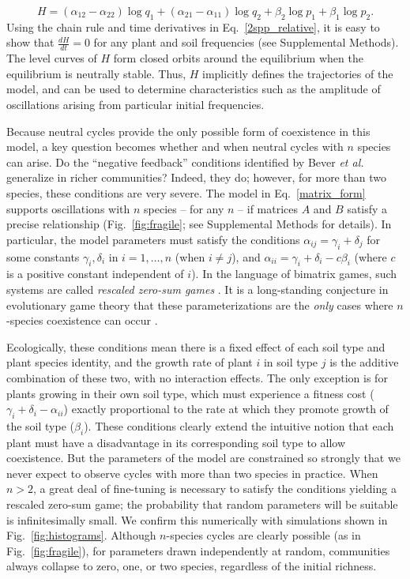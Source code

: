 \documentclass[11pt]{article}
\begin{document}
\begin{equation}
	H = (\alpha_{12} - \alpha_{22}) \log q_1 + (\alpha_{21} - \alpha_{11}) \log q_2 + \beta_2 \log p_1 + \beta_1 \log p_2 .
\end{equation} 
Using the chain rule and time derivatives in Eq.~\ref{2spp_relative}, it is easy to show that $\frac{dH}{dt} = 0$ for any plant and soil frequencies (see Supplemental Methods). The level curves of $H$ form closed orbits around the equilibrium when the equilibrium is neutrally stable. Thus, $H$ implicitly defines the trajectories of the model, and can be used to determine characteristics such as the amplitude of oscillations arising from particular initial frequencies.

Because neutral cycles provide the only possible form of coexistence in this model, a key question becomes whether and when neutral cycles with $n$ species can arise. Do the ``negative feedback'' conditions identified by Bever \textit{et al.} generalize in richer communities? Indeed, they do; however, for more than two species, these conditions are very severe. The model in Eq.~\ref{matrix_form} supports oscillations with $n$ species -- for any $n$ -- if matrices $A$ and $B$ satisfy a precise relationship (Fig.~\ref{fig:fragile}; see Supplemental Methods for details). In particular, the model parameters must satisfy the conditions $\alpha_{ij} = \gamma_i + \delta_j$ for some constants $\gamma_i, \delta_i$ in $i = 1, \dots, n$ (when $i \neq j$), and $\alpha_{ii} = \gamma_i + \delta_i- c \beta_i$ (where $c$ is a positive constant independent of $i$). In the language of bimatrix games, such systems are called \emph{rescaled zero-sum games} \citep{hofbauer1996evolutionary,hofbauer1998evolutionary}. It is a long-standing conjecture in evolutionary game theory that these parameterizations are the \emph{only} cases where $n$-species coexistence can occur \citep{hofbauer1996evolutionary,hofbauer2011deterministic}.

Ecologically, these conditions mean there is a fixed effect of each soil type and plant species identity, and the growth rate of plant $i$ in soil type $j$ is the additive combination of these two, with no interaction effects. The only exception is for plants growing in their own soil type, which must experience a fitness cost ($\gamma_i + \delta_i - \alpha_{ii}$) exactly proportional to the rate at which they promote growth of the soil type ($\beta_i$).  
These conditions clearly extend the intuitive notion that each plant must have a disadvantage in its corresponding soil type to allow coexistence. But the parameters of the model are constrained so strongly that we never expect to observe cycles with more than two species in practice. When $n > 2$, a great deal of fine-tuning is necessary to satisfy the conditions yielding a rescaled zero-sum game; the probability that random parameters will be suitable is infinitesimally small. We confirm this numerically with simulations shown in Fig.~\ref{fig:histograms}. Although $n$-species cycles are clearly possible (as in Fig.~\ref{fig:fragile}), for parameters drawn independently at random, communities always collapse to zero, one, or two species, regardless of the initial richness. 
\end{document}
